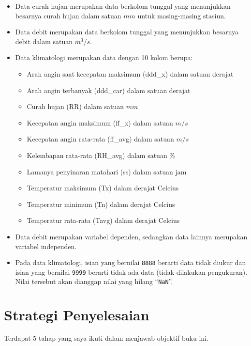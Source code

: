 \documentclass[11pt]{article}
\providecommand{\tightlist}{%
      \setlength{\itemsep}{0pt}\setlength{\parskip}{0pt}}
\begin{document}
\begin{itemize}
\tightlist
\item
  Data curah hujan merupakan data berkolom tunggal yang menunjukkan
  besarnya curah hujan dalam satuan \(mm\) untuk masing-masing stasiun.
\item
  Data debit merupakan data berkolom tunggal yang menunjukkan besarnya
  debit dalam satuan \(m^3/s\).
\item
  Data klimatologi merupakan data dengan 10 kolom berupa:

  \begin{itemize}
  \tightlist
  \item
    Arah angin saat kecepatan maksimum (ddd\_x) dalam satuan derajat
  \item
    Arah angin terbanyak (ddd\_car) dalam satuan derajat
  \item
    Curah hujan (RR) dalam satuan \(mm\)
  \item
    Kecepatan angin maksimum (ff\_x) dalam satuan \(m/s\)
  \item
    Kecepatan angin rata-rata (ff\_avg) dalam satuan \(m/s\)
  \item
    Kelembapan rata-rata (RH\_avg) dalam satuan \%
  \item
    Lamanya penyinaran matahari (ss) dalam satuan jam
  \item
    Temperatur maksimum (Tx) dalam derajat Celcius
  \item
    Temperatur minimum (Tn) dalam derajat Celcius
  \item
    Temperatur rata-rata (Tavg) dalam derajat Celcius
  \end{itemize}
\item
  Data debit merupakan variabel dependen, sedangkan data lainnya
  merupakan variabel independen.
\item
  Pada data klimatologi, isian yang bernilai \texttt{8888} berarti data
  tidak diukur dan isian yang bernilai \texttt{9999} berarti tidak ada
  data (tidak dilakukan pengukuran). Nilai tersebut akan dianggap nilai
  yang hilang ``\texttt{NaN}''.
\end{itemize}

    \hypertarget{strategi-penyelesaian}{%
\section{Strategi Penyelesaian}\label{strategi-penyelesaian}}

Terdapat 5 tahap yang saya ikuti dalam menjawab objektif buku ini.
\end{document}
